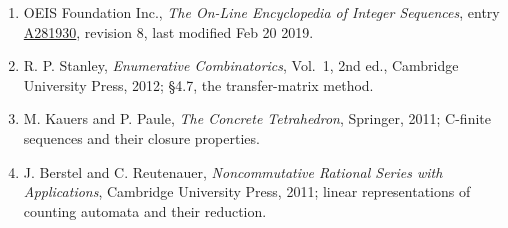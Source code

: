 \documentclass[11pt]{article}
\theoremstyle{definition}
\begin{document}
\begin{enumerate}

\item OEIS Foundation Inc., \emph{The On-Line Encyclopedia of Integer Sequences}, entry \href{https://oeis.org/A281930}{A281930}, revision 8, last modified Feb 20 2019.

\item R. P. Stanley, \emph{Enumerative Combinatorics}, Vol.~1, 2nd ed., Cambridge University Press, 2012; \S4.7, the transfer-matrix method.

\item M. Kauers and P. Paule, \emph{The Concrete Tetrahedron}, Springer, 2011; C-finite sequences and their closure properties.

\item J. Berstel and C. Reutenauer, \emph{Noncommutative Rational Series with Applications}, Cambridge University Press, 2011; linear representations of counting automata and their reduction.

\end{enumerate}
\end{document}
